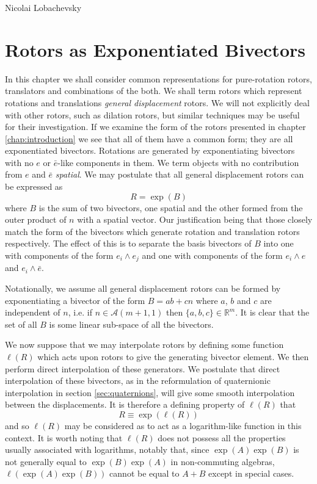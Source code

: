 \begin{savequote}
%
{Nicolai Lobachevsky}%
\end{savequote}

\chapter{Rotors as Exponentiated Bivectors}

In this chapter we shall consider common representations for pure-rotation
rotors, translators and combinations of the both. We shall term rotors which
represent rotations and translations \emph{general displacement} rotors. We
will not explicitly deal with other rotors, such as dilation rotors, but
similar techniques may be useful for their investigation.  If we examine the
form of the rotors presented in chapter \ref{chap:introduction} we see that
all of them have a common form; they are all exponentiated bivectors.
Rotations are generated by exponentiating bivectors with no
$e$ or $\bar{e}$-like components in them. We term objects with no contribution
from $e$ and $\bar{e}$ \emph{spatial}.
We may
postulate that all general displacement rotors can be expressed as
\[
R = \exp(B)
\]
where $B$ is the sum of two bivectors, one spatial and
the other formed from the outer product of
$n$ with a spatial vector. Our justification being that those closely match
the form of the bivectors which generate rotation and translation rotors 
respectively. The effect of this is to separate the basis bivectors of $B$
into one with components of the form $e_i \wedge e_j$ and one with components
of the form $e_i \wedge e$ and $e_i \wedge \bar{e}$.

Notationally, we assume all general displacement rotors can be formed by
exponentiating a bivector of the form $B = ab + cn$ where $a$, $b$ and $c$ are
independent of $n$, i.e. if $n \in \mathcal{A}(m+1,1)$ then $\{a,b,c\} \in
\mathbb{R}^m$.  It is clear that the set of all $B$ is some linear sub-space
of all the bivectors.

We now suppose that we may interpolate rotors by defining some function
$\ell(R)$ which acts upon rotors to give the generating bivector element. We
then perform direct interpolation of these generators.  We postulate that
direct interpolation of these bivectors, as in the reformulation of
quaternionic interpolation in section \ref{sec:quaternions}, will give some
smooth interpolation between the displacements.  It is therefore a defining
property of $\ell(R)$ that
\begin{equation}
R \equiv \exp(\ell(R))
\end{equation}
and so $\ell(R)$ may be considered as to act as a logarithm-like function in
this context.  It is worth noting that $\ell(R)$ does not possess all the
properties usually associated with logarithms, notably that, since
$\exp(A)\exp(B)$ is not generally equal to $\exp(B)\exp(A)$ in non-commuting
algebras, $\ell(\exp(A)\exp(B))$ cannot be equal to $A + B$ except in special
cases.

